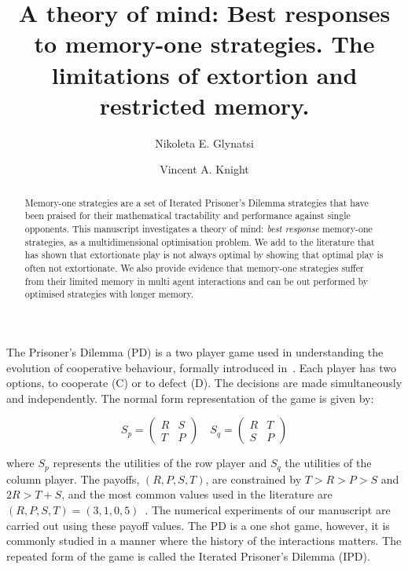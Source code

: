 \documentclass[10pt]{article}
\title{A theory of mind: Best responses to memory-one strategies. The limitations
of extortion and restricted memory.}
\author[1, *]{Nikoleta E. Glynatsi}
\author[1]{Vincent A. Knight}
\affil[1]{Cardiff University, School of Mathematics, Cardiff, United Kingdom}
\affil[*]{Corresponding author: Nikoleta E. Glynatsi, glynatsine@cardiff.ac.uk}
\date{}
\begin{document}
\maketitle

\newpage

\begin{abstract}
    Memory-one strategies are a set of Iterated Prisoner's Dilemma strategies
    that have been praised for their mathematical tractability and performance
    against single opponents. This manuscript investigates a theory of mind: \textit{best
    response} memory-one strategies, as a multidimensional
    optimisation problem. We add to the literature that has shown that
    extortionate play is not always optimal by showing that optimal play is
    often not extortionate.
    We
    also provide evidence that memory-one strategies suffer from their limited
    memory in multi agent interactions and can be out performed by
    optimised strategies with longer memory.
\end{abstract}

The Prisoner's Dilemma (PD) is a two player game used in understanding the
evolution of cooperative behaviour, formally introduced in~\cite{Flood1958}.
Each player has two options, to cooperate (C) or to defect (D). The decisions
are made simultaneously and independently. The normal form representation of the
game is given by:

\begin{equation}\label{equ:pd_definition}
    S_p =
    \begin{pmatrix}
        R & S  \\
        T & P
    \end{pmatrix}
    \quad
    S_q =
    \begin{pmatrix}
        R & T  \\
        S & P
    \end{pmatrix}
\end{equation}

where \(S_p\) represents the utilities of the row player and \(S_q\) the
utilities of the column player. The payoffs, \((R, P, S, T)\), are constrained
by \(T > R > P > S\) and \(2R > T + S\), and the most common values used in the
literature are \((R, P, S, T) = (3, 1, 0, 5)\)~\cite{Axelrod1981}.
The numerical experiments of our manuscript are carried out using these
payoff values.
The PD is a one shot game, however, it is commonly studied in a manner where the
history of the interactions matters. The repeated form of the game is called the
Iterated Prisoner's Dilemma (IPD).
\end{document}
